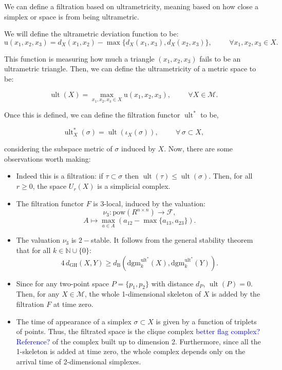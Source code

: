 \documentclass[a4paper,12pt,reqno, english]{amsart}
\newcommand{\dgh}{d_{\mathrm{GH}}}
\newcommand{\dB}{d_{\mathrm{B}}}
\newcommand{\dgm}{\mathrm{dgm}}
\newcommand{\pow}{\mathrm{pow}}
\newcommand{\ud}{\mathrm{u}}
\DeclareMathOperator{\ult}{ult}
\newcommand{\N}{\mathbb{N}}
\newcommand{\M}{\mathcal{M}}
\newcommand{\F}{\mathcal{F}}
\theoremstyle{plain}
\theoremstyle{definition}
\newcommand{\jose}[1]{\textcolor{blue}{#1} }
\begin{document}
{We can define a filtration based on ultrametricity, meaning based on how close a simplex or space is from being ultrametric.

We will define the ultrametric deviation function to be:
$$ \ud(x_1,x_2,x_3)= d_{X}(x_1,x_2)- \max\{d_X(x_1,x_3),d_X(x_2,x_3)\}, \hspace{1cm} \forall x_1,x_2,x_3\in X. $$

This function is measuring how much a triangle $(x_1,x_2,x_3)$ fails to be an ultrametric triangle. Then, we can define the ultrametricity of a metric space to be:

$$ \ult(X)= \max_{x_1,x_2,x_3\in X} \ud(x_1,x_2,x_3), \hspace{1cm} \forall X\in \mathcal{M}.$$

Once this is defined, we can define the filtration functor $\ult^*$ to be,

$$\ult^*_X(\sigma) = \ult(\iota_X(\sigma) ),\hspace{1cm} \forall \, \sigma \subset X,$$

considering the subspace metric of $\sigma$ induced by $X$. Now, there are some observations worth making:
\begin{itemize}
\item Indeed this is a filtration: if $\tau\subset \sigma$ then $\ult(\tau)\leq \ult(\sigma)$. Then, for all $r\geq 0$, the space $U_r(X)$ is a simplicial complex.

\item The filtration functor $F$ is $3$-local, induced by the valuation:
$$ \nu_3: \pow(R^{n\times n}) \rightarrow \F,$$
$$ A \longmapsto  \max_{a\in A} (a_{12}-\max\{a_{13}, a_{23} \}).$$

\item The valuation $\nu_3$ is $2-$stable. It follows from the general stability theorem that for all $k\in \N\cup \{0\}$:
$$4\, \dgh(X,Y)\geq \dB\left(\dgm^{\ult^*}_{k}(X), \dgm^{\ult^*}_{k}(Y) \right).$$

\item Since for any two-point space $P=\{p_1,p_2\}$ with distance $d_P$, $\ult(P)=0$. Then, for any $X\in \M$, the whole 1-dimensional skeleton of $X$ is added by the filtration $F$ at time zero. 

\item The time of appearance of a simplex $\sigma \subset X$ is given by a function of triplets of points. Thus, the filtrated space is the clique complex \jose{better flag complex? Reference?} of the complex built up to dimension 2. Furthermore, since all the 1-skeleton is added at time zero, the whole complex depends only on the arrival time of 2-dimensional simplexes.


\end{itemize}}
\end{document}
